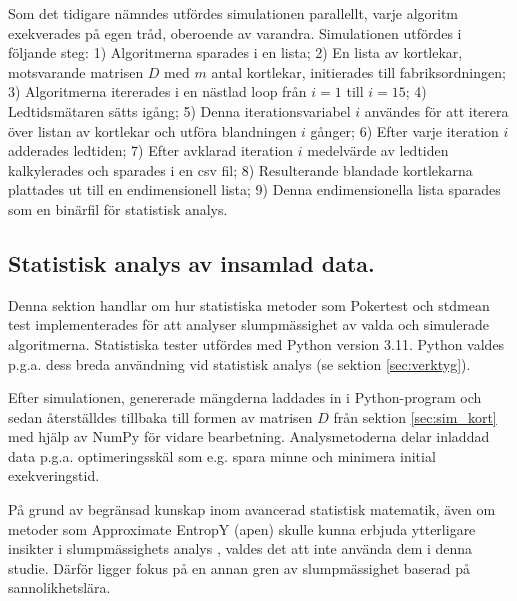 \documentclass[swedish,a4paper]{article}
\begin{document}
Som det tidigare nämndes utfördes simulationen parallellt, varje algoritm
exekverades på egen tråd, oberoende av varandra.
Simulationen utfördes i följande steg: 
1) Algoritmerna sparades i en lista;
2) En lista av kortlekar, motsvarande matrisen $D$ med $m$ antal kortlekar, initierades till fabriksordningen; 
3) Algoritmerna itererades i en nästlad loop från $i = 1$ till $i = 15$; 
4) Ledtidsmätaren sätts igång;
5) Denna iterationsvariabel $i$ användes för att iterera över listan av kortlekar
och utföra blandningen $i$ gånger;
6) Efter varje iteration $i$ adderades ledtiden;
7) Efter avklarad iteration $i$ medelvärde av ledtiden kalkylerades och
sparades i en csv fil;
8) Resulterande blandade kortlekarna plattades ut till en endimensionell lista;
9) Denna endimensionella lista sparades som en binärfil för statistisk analys.

%


\subsection{Statistisk analys av insamlad data.}
Denna sektion handlar om hur statistiska metoder som Pokertest och
\gls{stdmean} test implementerades för att analyser slumpmässighet av valda och
simulerade algoritmerna. Statistiska tester utfördes med Python version 3.11.
Python valdes p.g.a. dess breda användning vid statistisk analys (se sektion
\ref{sec:verktyg}).

Efter simulationen, genererade mängderna laddades in i Python-program och sedan återställdes tillbaka till
formen av matrisen $D$ från sektion \ref{sec:sim_kort} med hjälp av NumPy för vidare
bearbetning. Analysmetoderna delar inladdad data p.g.a. optimeringsskäl som e.g.
spara minne och minimera initial exekveringstid.

På grund av begränsad kunskap inom avancerad statistisk matematik,
även om metoder som Approximate EntropY (\gls{apen}) skulle kunna erbjuda
ytterligare insikter i slumpmässighets analys \parencite{ApEn}, valdes det att
inte använda dem i denna studie. Därför ligger fokus på en
annan gren av slumpmässighet baserad på
sannolikhetslära. %
\end{document}

